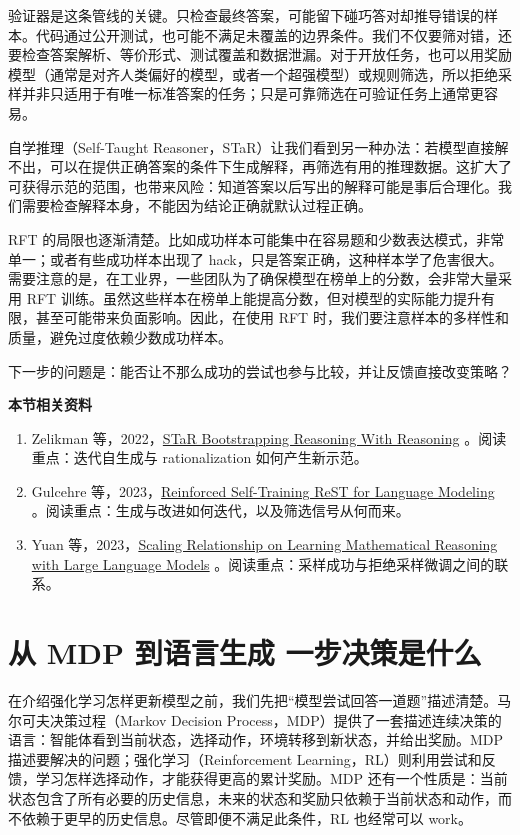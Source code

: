 验证器是这条管线的关键。只检查最终答案，可能留下碰巧答对却推导错误的样本。代码通过公开测试，也可能不满足未覆盖的边界条件。我们不仅要筛对错，还要检查答案解析、等价形式、测试覆盖和数据泄漏。对于开放任务，也可以用奖励模型（通常是对齐人类偏好的模型，或者一个超强模型）或规则筛选，所以拒绝采样并非只适用于有唯一标准答案的任务；只是可靠筛选在可验证任务上通常更容易。

自学推理（Self-Taught Reasoner，STaR）让我们看到另一种办法：若模型直接解不出，可以在提供正确答案的条件下生成解释，再筛选有用的推理数据。这扩大了可获得示范的范围，也带来风险：知道答案以后写出的解释可能是事后合理化。我们需要检查解释本身，不能因为结论正确就默认过程正确。

RFT 的局限也逐渐清楚。比如成功样本可能集中在容易题和少数表达模式，非常单一；或者有些成功样本出现了 hack，只是答案正确，这种样本学了危害很大。需要注意的是，在工业界，一些团队为了确保模型在榜单上的分数，会非常大量采用 RFT 训练。虽然这些样本在榜单上能提高分数，但对模型的实际能力提升有限，甚至可能带来负面影响。因此，在使用 RFT 时，我们要注意样本的多样性和质量，避免过度依赖少数成功样本。

下一步的问题是：能否让不那么成功的尝试也参与比较，并让反馈直接改变策略？

\textbf{本节相关资料}
\begin{enumerate}
    \item Zelikman 等，2022，\href{https://arxiv.org/abs/2203.14465}{STaR Bootstrapping Reasoning With Reasoning} 。阅读重点：迭代自生成与 rationalization 如何产生新示范。
    \item Gulcehre 等，2023，\href{https://arxiv.org/abs/2308.08998}{Reinforced Self-Training ReST for Language Modeling} 。阅读重点：生成与改进如何迭代，以及筛选信号从何而来。
    \item Yuan 等，2023，\href{https://arxiv.org/abs/2308.01825}{Scaling Relationship on Learning Mathematical Reasoning with Large Language Models} 。阅读重点：采样成功与拒绝采样微调之间的联系。
\end{enumerate}

\section{从 MDP 到语言生成 一步决策是什么}\label{从MDP到语言生成}

在介绍强化学习怎样更新模型之前，我们先把``模型尝试回答一道题''描述清楚。马尔可夫决策过程（Markov Decision Process，MDP）提供了一套描述连续决策的语言：智能体看到当前状态，选择动作，环境转移到新状态，并给出奖励。MDP 描述要解决的问题；强化学习（Reinforcement Learning，RL）则利用尝试和反馈，学习怎样选择动作，才能获得更高的累计奖励。MDP 还有一个性质是：当前状态包含了所有必要的历史信息，未来的状态和奖励只依赖于当前状态和动作，而不依赖于更早的历史信息。尽管即便不满足此条件，RL 也经常可以 work。

